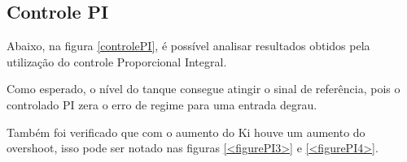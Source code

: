 \documentclass[a4paper,12pt]{article}
\begin{document}
\subsection{Controle PI}
\hspace{4ex}Abaixo, na figura \ref{controlePI}, é possível analisar resultados obtidos pela utilização do controle Proporcional Integral.

\hspace{4ex}Como esperado, o nível do tanque consegue atingir o sinal de referência, pois o controlado PI zera o erro de regime para uma entrada degrau.

\hspace{4ex}Também foi verificado que com o aumento do Ki houve um aumento do overshoot, isso pode ser notado nas figuras \ref{<figurePI3>} e \ref{<figurePI4>}.
\begin{figure}[H]
     \centering
     \hspace{4ex}
     \\
     \hspace{4ex}

\end{figure}
\end{document}
